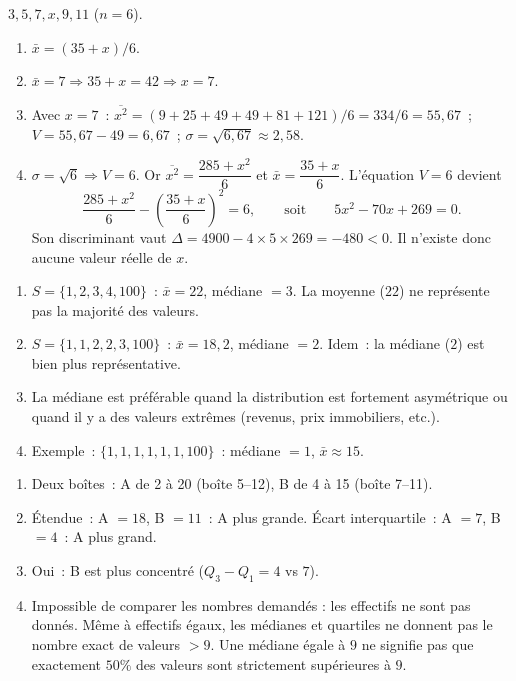 $3,5,7,x,9,11$ ($n=6$).
\begin{enumerate}
  \item $\bar{x}=(35+x)/6$.
  \item $\bar{x}=7\Rightarrow35+x=42\Rightarrow x=7$.
  \item Avec $x=7$~: $\overline{x^2}=(9+25+49+49+81+121)/6=334/6=55{,}67$~;
        $V=55{,}67-49=6{,}67$~; $\sigma=\sqrt{6{,}67}\approx2{,}58$.
  \item $\sigma=\sqrt{6}\Rightarrow V=6$. Or
        $\overline{x^2}=\dfrac{285+x^2}{6}$ et $\bar{x}=\dfrac{35+x}{6}$.
        L'\'equation $V=6$ devient
        \[\dfrac{285+x^2}{6}-\left(\dfrac{35+x}{6}\right)^2=6,
        \qquad\text{soit}\qquad 5x^2-70x+269=0.\]
        Son discriminant vaut $\Delta=4900-4\times5\times269=-480<0$.
        Il n'existe donc aucune valeur r\'eelle de $x$.
\end{enumerate}


\begin{enumerate}
  \item $S=\{1,2,3,4,100\}$~: $\bar{x}=22$, m\'ediane $=3$.
        La moyenne ($22$) ne repr\'esente pas la majorit\'e des valeurs.
  \item $S=\{1,1,2,2,3,100\}$~: $\bar{x}=18{,}2$, m\'ediane $=2$.
        Idem~: la m\'ediane ($2$) est bien plus repr\'esentative.
  \item La m\'ediane est pr\'ef\'erable quand la distribution est fortement asym\'etrique
        ou quand il y a des valeurs extr\^emes (revenus, prix immobiliers, etc.).
  \item Exemple~: $\{1,1,1,1,1,1,100\}$~: m\'ediane $=1$, $\bar{x}\approx15$.
\end{enumerate}


\begin{enumerate}
  \item Deux bo\^ites~: A de 2 \`a 20 (bo\^ite 5--12), B de 4 \`a 15 (bo\^ite 7--11).
  \item \'Etendue~: A $=18$, B $=11$~: A plus grande.
        \'Ecart interquartile~: A $=7$, B $=4$~: A plus grand.
  \item Oui~: B est plus concentr\'e ($Q_3-Q_1=4$ vs $7$).
  \item Impossible de comparer les nombres demand\'es : les effectifs ne sont pas donn\'es.
        M\^eme \`a effectifs \'egaux, les m\'edianes et quartiles ne donnent pas le
        nombre exact de valeurs $>9$. Une m\'ediane \'egale \`a $9$ ne signifie
        pas que exactement $50\%$ des valeurs sont strictement sup\'erieures \`a $9$.
\end{enumerate}

